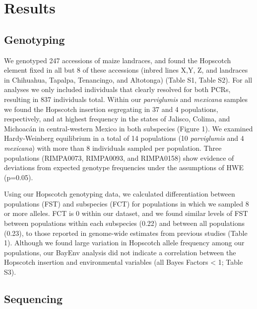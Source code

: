\documentclass[12pt]{article}
\begin{document}
\section*{Results}

\subsection*{Genotyping}

We genotyped 247 accessions of maize landraces, and found the Hopscotch element fixed in all but 8 of these accessions (inbred lines X,Y, Z, and landraces in Chihuahua, Tapalpa, Tenancingo, and Altotonga) (Table S1, Table S2). For all analyses we only included individuals that clearly resolved for both PCRs, resulting in 837 individuals total. Within our \emph{parviglumis} and \emph{mexicana} samples we found the Hopscotch insertion segregating in 37 and 4 populations, respectively, and at highest frequency in the states of Jalisco, Colima, and Michoacán in central-western Mexico in both subspecies (Figure 1). We examined Hardy-Weinberg equilibrium in a total of 14 populations (10 \emph{parviglumis} and 4 \emph{mexicana}) with more than 8 individuals sampled per population. Three populations (RIMPA0073, RIMPA0093, and RIMPA0158) show evidence of deviations from expected genotype frequencies under the assumptions of HWE (p=0.05). 

Using our Hopscotch genotyping data, we calculated differentiation between populations (FST) and subspecies (FCT) for populations in which we sampled 8 or more alleles. FCT is 0 within our dataset, and we found similar levels of FST between populations within each subspecies (0.22) and between all populations (0.23), to those reported in genome-wide estimates from previous studies \cite{Pyhajarvi et al 2013} (Table 1). Although we found large variation in Hopscotch allele frequency among our populations, our BayEnv analysis did not indicate a correlation between the Hopscotch insertion and environmental variables (all Bayes Factors < 1; Table S3). 

\subsection*{Sequencing}
\end{document}
